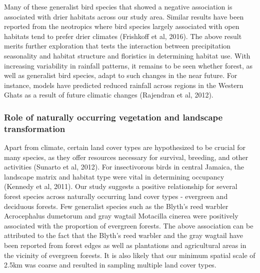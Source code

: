 Many of these generalist bird species that showed a negative association is associated with drier habitats across our study area.
Similar results have been reported from the neotropics where bird species largely associated with open habitats tend to prefer drier climates (Frishkoff et al, 2016).
The above result merits further exploration that tests the interaction between precipitation seasonality and habitat structure and floristics in determining habitat use.
With increasing variability in rainfall patterns, it remains to be seen whether forest, as well as generalist bird species, adapt to such changes in the near future.
For instance, models have predicted reduced rainfall across regions in the Western Ghats as a result of future climatic changes (Rajendran et al, 2012).

\subsubsection*{Role of naturally occurring vegetation and landscape transformation}

Apart from climate, certain land cover types are hypothesized to be crucial for many species, as they offer resources necessary for survival, breeding, and other activities (Sunarto et al, 2012).
For insectivorous birds in central Jamaica, the landscape matrix and habitat type were vital in determining occupancy (Kennedy et al, 2011).
Our study suggests a positive relationship for several forest species across naturally occurring land cover types - evergreen and deciduous forests.
Few generalist species such as the Blyth's reed warbler Acrocephalus dumetorum and gray wagtail Motacilla cinerea were positively associated with the proportion of evergreen forests.
The above association can be attributed to the fact that the Blyth's reed warbler and the gray wagtail have been reported from forest edges as well as plantations and agricultural areas in the vicinity of evergreen forests.
It is also likely that our minimum spatial scale of 2.5km was coarse and resulted in sampling multiple land cover types.

